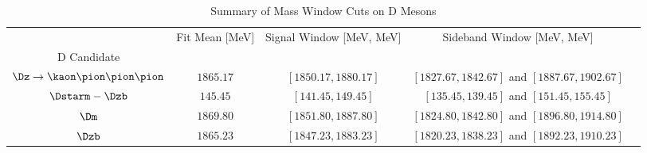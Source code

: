 \begin{table}
\centering
\caption{Summary of Mass Window Cuts on D Mesons}
\label{tab:dwindows}
\begin{tabular}{ccccc}
\toprule
{} & Fit Mean [MeV] & Signal Window [MeV, MeV] &                     Sideband Window [MeV, MeV] \\
D Candidate                          &                &                          &                                                \\
\midrule
$\Dz\rightarrow\kaon\pion\pion\pion$ &      $1865.17$ &     $[1850.17, 1880.17]$ &  $[1827.67, 1842.67]$ and $[1887.67, 1902.67]$ \\
$\Dstarm - \Dzb$                     &       $145.45$ &       $[141.45, 149.45]$ &      $[135.45, 139.45]$ and $[151.45, 155.45]$ \\
$\Dm$                                &      $1869.80$ &     $[1851.80, 1887.80]$ &  $[1824.80, 1842.80]$ and $[1896.80, 1914.80]$ \\
$\Dzb$                               &      $1865.23$ &     $[1847.23, 1883.23]$ &  $[1820.23, 1838.23]$ and $[1892.23, 1910.23]$ \\
\bottomrule
\end{tabular}
\end{table}
